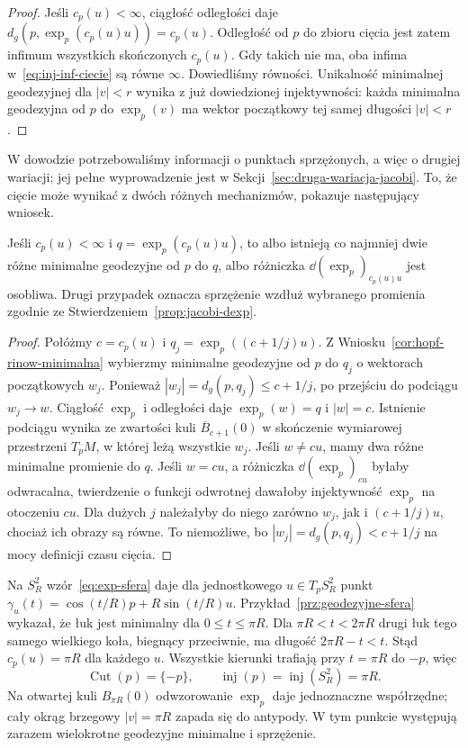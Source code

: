 \begin{proof}
Jeśli $c_p(u)<\infty$, ciągłość odległości daje
$d_g(p,\exp_p(c_p(u)u))=c_p(u)$.
Odległość od $p$ do zbioru cięcia jest zatem
infimum wszystkich skończonych $c_p(u)$.
Gdy takich nie ma, oba infima w~\eqref{eq:inj-inf-ciecie}
są równe $\infty$. Dowiedliśmy równości.
Unikalność minimalnej geodezyjnej dla $|v|<r$
wynika z już dowiedzionej injektywności:
każda minimalna geodezyjna od $p$ do $\exp_p(v)$
ma wektor początkowy tej samej długości $|v|<r$.
\end{proof}

W dowodzie potrzebowaliśmy informacji o punktach
sprzężonych, a więc o drugiej wariacji; jej pełne
wyprowadzenie jest w Sekcji~\ref{sec:druga-wariacja-jacobi}.
To, że cięcie może wynikać z dwóch różnych mechanizmów,
pokazuje następujący wniosek.

\begin{wniosek}
\label{cor:ciecie-sprzezenie-lub-dwa-promienie}
Jeśli $c_p(u)<\infty$ i $q=\exp_p(c_p(u)u)$,
to albo istnieją co najmniej dwie różne minimalne
geodezyjne od $p$ do $q$, albo różniczka
$\dd(\exp_p)_{c_p(u)u}$ jest osobliwa.
Drugi przypadek oznacza sprzężenie wzdłuż wybranego
promienia zgodnie ze Stwierdzeniem~\ref{prop:jacobi-dexp}.
\end{wniosek}
\begin{proof}
Połóżmy $c=c_p(u)$ i $q_j=\exp_p((c+1/j)u)$.
Z Wniosku~\ref{cor:hopf-rinow-minimalna} wybierzmy
minimalne geodezyjne od $p$ do $q_j$ o wektorach
początkowych $w_j$. Ponieważ
$|w_j|=d_g(p,q_j)\leq c+1/j$, po przejściu do
podciągu $w_j\to w$. Ciągłość $\exp_p$ i odległości
daje $\exp_p(w)=q$ i $|w|=c$.
Istnienie podciągu wynika ze zwartości kuli
$\overline B_{c+1}(0)$ w skończenie wymiarowej
przestrzeni $T_pM$, w której leżą wszystkie $w_j$.
Jeśli $w\ne cu$, mamy dwa różne minimalne promienie
do $q$. Jeśli $w=cu$, a różniczka
$\dd(\exp_p)_{cu}$ byłaby odwracalna, twierdzenie
o funkcji odwrotnej dawałoby injektywność $\exp_p$
na otoczeniu $cu$. Dla dużych $j$ należałyby
do niego zarówno $w_j$, jak i $(c+1/j)u$,
chociaż ich obrazy są równe. To niemożliwe,
bo $|w_j|=d_g(p,q_j)<c+1/j$
na mocy definicji czasu cięcia.
\end{proof}

\begin{przyklad}
\label{prz:ciecie-sfera}
Na $S_R^2$ wzór~\eqref{eq:exp-sfera} daje dla jednostkowego
$u\in T_pS_R^2$ punkt
$\gamma_u(t)=\cos(t/R)p+R\sin(t/R)u$.
Przykład~\ref{prz:geodezyjne-sfera} wykazał,
że łuk jest minimalny dla $0\leq t\leq\pi R$.
Dla $\pi R<t<2\pi R$ drugi łuk tego samego
wielkiego koła, biegnący przeciwnie, ma długość
$2\pi R-t<t$. Stąd $c_p(u)=\pi R$ dla każdego $u$.
Wszystkie kierunki trafiają przy $t=\pi R$
do $-p$, więc
\[
 \operatorname{Cut}(p)=\{-p\},\qquad
 \operatorname{inj}(p)=\operatorname{inj}(S_R^2)=\pi R.
\]
Na otwartej kuli $B_{\pi R}(0)$ odwzorowanie
$\exp_p$ daje jednoznaczne współrzędne;
cały okrąg brzegowy $|v|=\pi R$ zapada się
do antypody. W tym punkcie występują zarazem
wielokrotne geodezyjne minimalne i sprzężenie.
\end{przyklad}

